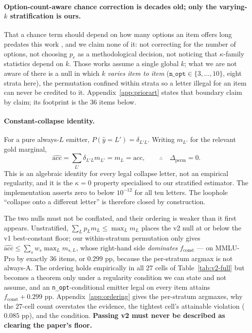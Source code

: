 \paragraph{Option-count-aware chance correction is decades old; only the varying-$k$ stratification is ours.}
That a chance term should depend on how many options an item offers long predates this work
\citep{bennett1954communications,brennan1981kappa,frary1988formula,brenner1996weightedkappa,%
devries2008pooledkappa}, and we claim none of it: not correcting for the number of options, not
choosing $p_e$ as a methodological decision, not noticing that $\kappa$-family statistics depend on
$k$. Those works assume a single global $k$; what we are not aware of there is a null in which $k$
\emph{varies item to item} ($\texttt{n\_opt}\in\{3,\dots,10\}$, eight strata here), the permutation
confined within strata so a letter illegal for an item can never be credited to it.
Appendix~\ref{app:priorart} states that boundary claim by claim; its footprint is the $36$ items
below.

\paragraph{Constant-collapse identity.}
For a pure always-$L$ emitter, $P(\hat{y}=L')=\delta_{L'L}$. Writing $m_{L'}$ for the relevant gold marginal,
\begin{equation}
\widehat{\mathrm{acc}}
=\sum_{L'}\delta_{L'L}m_{L'}
=m_{L}
=\mathrm{acc},
\qquad
\therefore\quad \Delta_{\mathrm{perm}}=0.
\end{equation}
This is an algebraic identity for every legal collapse letter, not an empirical regularity, and it is the $\kappa=0$ property specialised to our stratified estimator. The implementation asserts zero to below $10^{-12}$ for all ten letters. The loophole ``collapse onto a different letter'' is therefore closed by construction.

The two nulls must not be conflated, and their ordering is weaker than it first appears. Unstratified, $\sum_L p_{L}m_{L}\leq\max_Lm_{L}$ places the v2 null at or below the v1 best-constant floor; our within-stratum permutation only gives $\widehat{\mathrm{acc}}\leq\sum_s w_s\max_L m_{s,L}$, whose right-hand side \emph{dominates} $f_{\mathrm{const}}$ --- on MMLU-Pro by exactly $36$ items, or $0.299$ pp, because the per-stratum argmax is not always-A. The ordering holds empirically in all 27 cells of Table~\ref{tab:v2-full} but becomes a theorem only under a regularity condition we can state and not assume, and an \texttt{n\_opt}-conditional emitter legal on every item attains $f_{\mathrm{const}}+0.299$ pp. Appendix~\ref{app:ordering} gives the per-stratum argmaxes, why the 27-cell count overstates the evidence, the tightest cell's attainable violation ($0.085$ pp), and the condition. \textbf{Passing v2 must never be described as clearing the paper's floor.}

